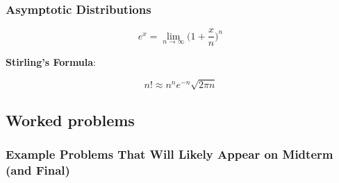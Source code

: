 \subsubsection{Asymptotic Distributions}

\begin{proposition}
\[
e^x = \lim_{n \to \infty} \bigg( 1 + \frac{x}{n}\bigg)^n
\]
\end{proposition}

\begin{theorem} \label{prob.stirling} \textbf{Stirling's Formula}: 

\[
n! \approx n^ne^{-n} \sqrt{2\pi n}
\]
\end{theorem}

\subsection{Worked problems}

\subsubsection{Example Problems That Will Likely Appear on Midterm (and Final)}

